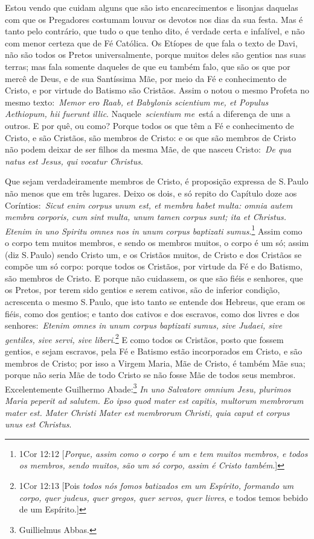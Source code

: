 Estou vendo que cuidam alguns que são isto encarecimentos e
lisonjas daquelas com que os Pregadores costumam louvar os devotos nos
dias da sua festa. Mas é tanto pelo contrário, que tudo o que tenho
dito, é verdade certa e infalível, e não com menor certeza que de Fé
Católica. Os Etíopes de que fala o texto de Davi, não são todos os
Pretos universalmente, porque muitos deles são gentios nas suas terras;
mas fala somente daqueles de que eu também falo, que são os que por
mercê de Deus, e de sua Santíssima Mãe, por meio da Fé e conhecimento de
Cristo, e por virtude do Batismo são Cristãos. Assim o notou o mesmo
Profeta no mesmo texto:~\emph{Memor ero Raab, et Babylonis scientium me,
et Populus Aethiopum, hii fuerunt illic}. Naquele~\emph{scientium
me}~está a diferença de uns a outros. E por quê, ou como? Porque todos
os que têm a Fé e conhecimento de Cristo, e são Cristãos, são membros de
Cristo: e os que são membros de Cristo não podem deixar de ser filhos da
mesma Mãe, de que nasceu Cristo:~\emph{De qua natus est Jesus, qui
vocatur Christus}.

Que sejam verdadeiramente membros de Cristo, é proposição
expressa de S.\,Paulo não menos que em três lugares. Deixo os dois, e só
repito do Capítulo doze aos Coríntios:~\emph{Sicut enim corpus unum est,
et membra habet multa: omnia autem membra corporis, cum sint multa, unum
tamen corpus sunt; ita et Christus. Etenim in uno Spiritu omnes nos in
unum corpus baptizati sumus}.\footnote{1Cor 12:12 [\textit{Porque, assim como o corpo é um e tem muitos membros, e todos os membros, sendo muitos, são um só corpo, assim é Cristo também}.]} Assim como o corpo tem
muitos membros, e sendo os membros muitos, o corpo é um só; assim (diz
S.\,Paulo) sendo Cristo um, e os Cristãos muitos, de Cristo e dos
Cristãos se compõe um só corpo: porque todos os Cristãos, por virtude da
Fé e do Batismo, são membros de Cristo. E porque não cuidassem, os que
são fiéis e senhores, que os Pretos, por terem sido gentios e serem
cativos, são de inferior condição, acrescenta o mesmo S.\,Paulo, que isto
tanto se entende dos Hebreus, que eram os fiéis, como dos gentios; e
tanto dos cativos e dos escravos, como dos livres e dos
senhores:~\emph{Etenim omnes in unum corpus baptizati sumus, sive
Judaei, sive gentiles, sive servi, sive liberi}.\footnote{1Cor 12:13 [Pois \textit{todos nós fomos batizados em um Espírito, formando um corpo, quer judeus, quer gregos, quer servos, quer livres}, e todos temos bebido de um Espírito.]} E
como todos os Cristãos, posto que fossem gentios, e sejam escravos, pela
Fé e Batismo estão incorporados em Cristo, e são membros de Cristo; por
isso a Virgem Maria, Mãe de Cristo, é também Mãe sua; porque não seria
Mãe de todo Cristo se não fosse Mãe de todos seus membros.
Excelentemente Guilhermo Abade:\footnote{Guillielmus Abbas.} \emph{In uno Salvatore omnium Jesu,
plurimos Maria peperit ad salutem. Eo ipso quod mater est capitis,
multorum membrorum mater est. Mater Christi Mater est membrorum Christi,
quia caput et corpus unus est Christus}.

